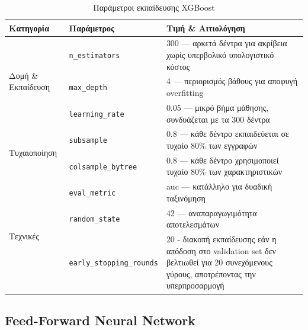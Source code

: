 \begin{table}[htbp]
\centering
\caption{Παράμετροι εκπαίδευσης XGBoost}
\label{tab:xgb_params}
\begin{tabular}{llp{7cm}}
\toprule
\textbf{Κατηγορία} & \textbf{Παράμετρος} & \textbf{Τιμή \& Αιτιολόγηση} \\
\midrule
\multirow{3}{*}{Δομή \& Εκπαίδευση}
  & \texttt{n\_estimators} & 300 — αρκετά δέντρα για ακρίβεια χωρίς υπερβολικό υπολογιστικό κόστος \\
  & \texttt{max\_depth}    & 4 — περιορισμός βάθους για αποφυγή overfitting \\
  & \texttt{learning\_rate}& 0.05 — μικρό βήμα μάθησης, συνδυάζεται με τα 300 δέντρα \\
\midrule
\multirow{2}{*}{Τυχαιοποίηση}
  & \texttt{subsample}        & 0.8 — κάθε δέντρο εκπαιδεύεται σε τυχαίο 80\% των εγγραφών \\
  & \texttt{colsample\_bytree}& 0.8 — κάθε δέντρο χρησιμοποιεί τυχαίο 80\% των χαρακτηριστικών \\
\midrule
\multirow{3}{*}{Τεχνικές}
  & \texttt{eval\_metric}        & auc — κατάλληλο για δυαδική ταξινόμηση \\
  & \texttt{random\_state}       & 42 — αναπαραγωγιμότητα αποτελεσμάτων \\
  & \texttt{early\_stopping\_rounds}& 20 - διακοπή εκπαίδευσης εάν η απόδοση στο validation set δεν βελτιωθεί για 20 συνεχόμενους γύρους, αποτρέποντας την υπερπροσαρμογή\\ 
\bottomrule
\end{tabular}
\end{table}

\subsection{Feed-Forward Neural Network}
\label{sec:ffnn}

